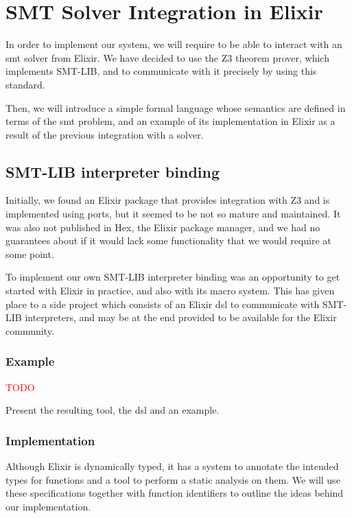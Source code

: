 \chapter{SMT Solver Integration in Elixir}
\label{cap:smtSolverIntegration}

In order to implement our system, we will require to be able to interact with
an \acrshort{smt} solver from Elixir. We have decided to use the Z3 theorem
prover, which implements SMT-LIB, and to communicate with it precisely by using
this standard.

Then, we will introduce a simple formal language whose semantics are defined
in terms of the \gls{smt} problem, and an example of its implementation in 
Elixir as a result of the previous integration with a solver.

\section{SMT-LIB interpreter binding}

Initially, we found an Elixir package that provides integration with Z3 and is
implemented using ports, but it seemed to be not so mature and maintained. It 
was also not published in Hex, the Elixir package manager, and we had no
guarantees about if it would lack some functionality that we would require at
some point.

To implement our own SMT-LIB interpreter binding was an opportunity to get
started with Elixir in practice, and also with its macro system. This has 
given place to a side project which consists of an Elixir \gls{dsl} to
communicate with SMT-LIB interpreters, and may be at the end provided to 
be available for the Elixir community.

\subsection{Example}
\label{integ:dslexample}

\textcolor{red}{TODO}

Present the resulting tool, the \gls{dsl} and an example.

\subsection{Implementation}

Although Elixir is dynamically typed, it has a system to annotate the intended
types for functions and a tool to perform a static analysis on them. We will
use these specifications together with function identifiers to outline the ideas
behind our implementation.


